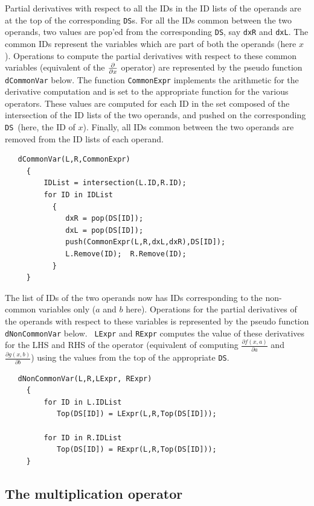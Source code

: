 \documentclass[12pt]{article}
\newcommand{\DS}{{\tt DS}}
\begin{document}
Partial derivatives with respect to all the IDs in the ID lists of the
operands are at the top of the corresponding \DS s.  For all the IDs
common between the two operands, two values are pop'ed from the
corresponding \DS, say {\tt dxR} and {\tt dxL}.  The common IDs
represent the variables which are part of both the operands (here
$x$).  Operations to compute the partial derivatives with respect to
these common variables (equivalent of the ${\partial \over \partial
x}$ operator) are represented by the pseudo function {\tt dCommonVar}
below.  The function {\tt CommonExpr} implements the arithmetic for
the derivative computation and is set to the appropriate function for
the various operators.  These values are computed for each ID in the
set composed of the intersection of the ID lists of the two operands,
and pushed on the corresponding \DS\ (here, the ID of $x$).  Finally,
all IDs common between the two operands are removed from the ID lists
of each operand.
\begin{verbatim}
   dCommonVar(L,R,CommonExpr) 
     { 
         IDList = intersection(L.ID,R.ID); 
         for ID in IDList 
           { 
              dxR = pop(DS[ID]); 
              dxL = pop(DS[ID]); 
              push(CommonExpr(L,R,dxL,dxR),DS[ID]);
              L.Remove(ID);  R.Remove(ID); 
           } 
     }
\end{verbatim}
The list of IDs of the two operands now has IDs corresponding to the
non-common variables only ($a$ and $b$ here).  Operations for the
partial derivatives of the operands with respect to these variables is
represented by the pseudo function {\tt dNonCommonVar} below.  {\tt
LExpr} and {\tt RExpr} computes the value of these derivatives for the
LHS and RHS of the operator (equivalent of computing $\frac{\partial
f(x,a)}{\partial a}$ and $\frac{\partial g(x,b)}{\partial b}$) using
the values from the top of the appropriate
\DS.
\begin{verbatim}
   dNonCommonVar(L,R,LExpr, RExpr)
     {
         for ID in L.IDList
            Top(DS[ID]) = LExpr(L,R,Top(DS[ID]));

         for ID in R.IDList
            Top(DS[ID]) = RExpr(L,R,Top(DS[ID]));
     }
\end{verbatim}
%
%
\subsection{The multiplication operator}
\end{document}
